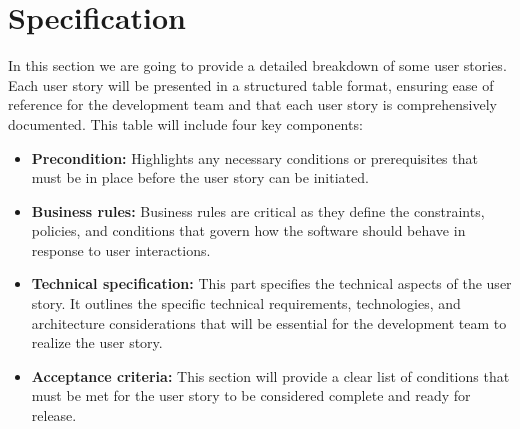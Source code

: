 \section{Specification}
In this section we are going to provide a detailed breakdown of some user stories. Each user story will
be presented in a structured table format, ensuring ease of reference for the development
team and that each user story is comprehensively documented. This table will include four key components:

\begin{itemize}
    \item \textbf{Precondition:} Highlights any necessary conditions or prerequisites that must be
          in place before the user story can be initiated.
    \item \textbf{Business rules:} Business rules are critical as they define the constraints, policies,
          and conditions that govern how the software should behave in response to user interactions.
    \item \textbf{Technical specification:} This part specifies the technical aspects of the user story.
          It outlines the specific technical requirements, technologies, and architecture considerations that
          will be essential for the development team to realize the user story.
    \item \textbf{Acceptance criteria:} This section will provide a clear list of conditions that must
          be met for the user story to be considered complete and ready for release.
\end{itemize}


